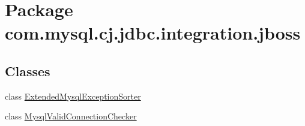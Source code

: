 \hypertarget{namespacecom_1_1mysql_1_1cj_1_1jdbc_1_1integration_1_1jboss}{}\section{Package com.\+mysql.\+cj.\+jdbc.\+integration.\+jboss}
\label{namespacecom_1_1mysql_1_1cj_1_1jdbc_1_1integration_1_1jboss}
\subsection*{Classes}
\begin{DoxyCompactItemize}
\item 
class \mbox{\hyperlink{classcom_1_1mysql_1_1cj_1_1jdbc_1_1integration_1_1jboss_1_1_extended_mysql_exception_sorter}{Extended\+Mysql\+Exception\+Sorter}}
\item 
class \mbox{\hyperlink{classcom_1_1mysql_1_1cj_1_1jdbc_1_1integration_1_1jboss_1_1_mysql_valid_connection_checker}{Mysql\+Valid\+Connection\+Checker}}
\end{DoxyCompactItemize}
